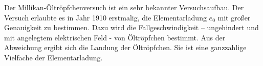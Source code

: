 Der Millikan-Öltröpfchenversuch ist ein sehr bekannter Versuchsaufbau. Der Versuch erlaubte es in Jahr 1910 erstmalig, die Elementarladung $e_0$ mit großer Genauigkeit zu bestimmen. Dazu wird die Fallgeschwindigkeit -- ungehindert und mit angelegtem elektrischen Feld - von Öltröpfchen bestimmt. Aus der Abweichung ergibt sich die Landung der Öltröpfchen. Sie ist eine ganzzahlige Vielfache der Elementarladung.
